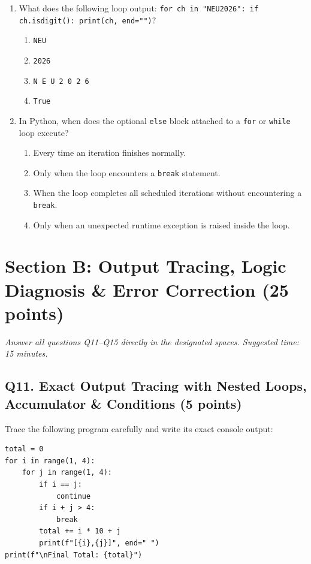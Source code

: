 \documentclass[11pt,a4paper]{article}
\begin{document}
\begin{enumerate}[label=\textbf{Q\arabic*.},leftmargin=2em,itemsep=1.5pt,topsep=1pt,resume]
\item What does the following loop output: \texttt{for ch in "NEU2026": if ch.isdigit(): print(ch, end="")}?
\begin{enumerate}[label=\Alph*.,leftmargin=2em]
  \item \texttt{NEU}
  \item \texttt{2026}
  \item \texttt{N E U 2 0 2 6}
  \item \texttt{True}
\end{enumerate}

\item In Python, when does the optional \texttt{else} block attached to a \texttt{for} or \texttt{while} loop execute?
\begin{enumerate}[label=\Alph*.,leftmargin=2em]
  \item Every time an iteration finishes normally.
  \item Only when the loop encounters a \texttt{break} statement.
  \item When the loop completes all scheduled iterations without encountering a \texttt{break}.
  \item Only when an unexpected runtime exception is raised inside the loop.
\end{enumerate}

\end{enumerate}

\vspace{1mm}
\section*{Section B: Output Tracing, Logic Diagnosis \& Error Correction \hfill \normalsize\normalfont(25 points)}
\textit{Answer all questions Q11--Q15 directly in the designated spaces. Suggested time: 15 minutes.}

\subsection*{Q11. Exact Output Tracing with Nested Loops, Accumulator \& Conditions (5 points)}
Trace the following program carefully and write its exact console output:

\begin{lstlisting}
total = 0
for i in range(1, 4):
    for j in range(1, 4):
        if i == j:
            continue
        if i + j > 4:
            break
        total += i * 10 + j
        print(f"[{i},{j}]", end=" ")
print(f"\nFinal Total: {total}")
\end{lstlisting}
\end{document}
